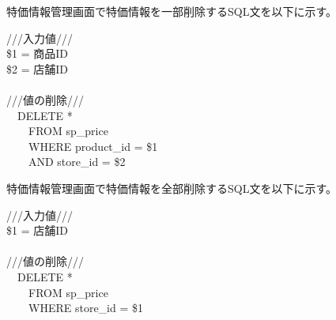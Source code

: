 \documentclass[a4j]{jarticle}
\begin{document}
特価情報管理画面で特価情報を一部削除するSQL文を以下に示す。

\begin{screen}
  ///入力値///\\
  \$1 = 商品ID\\
  \$2 = 店舗ID\\
  \\
  ///値の削除///\\
  　DELETE *\\
  　　FROM sp\_price\\
  　　WHERE product\_id = \$1\\
  　　AND store\_id = \$2
\end{screen}

特価情報管理画面で特価情報を全部削除するSQL文を以下に示す。

\begin{screen}
  ///入力値///\\
  \$1 = 店舗ID\\
  \\
  ///値の削除///\\
  　DELETE *\\
  　　FROM sp\_price\\
  　　WHERE store\_id = \$1
\end{screen}
\end{document}
